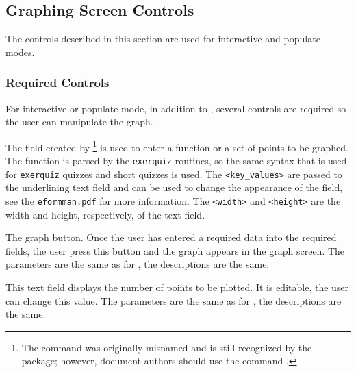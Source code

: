 \documentclass{article}
\begin{document}
\subsection{Graphing Screen Controls}

The controls described in this section are used for interactive and
populate modes.

\subsubsection{Required Controls}

For interactive or populate mode, in addition to ,
several controls are required so the user can manipulate the graph.

\begin{dCmd}{.75\linewidth}
\end{dCmd}
\CmdDescription The field created by
\footnote{The command was originally misnamed
 and is still recognized by the {\AcroFLeX}
package; however, document authors should use the command
.} is used to enter a function or a set of points
to be graphed. The function is parsed by the \texttt{exerquiz}
routines, so the same syntax that is used for \texttt{exerquiz}
quizzes and short quizzes is used. The \texttt{<key\_values>} are
passed to the underlining text field and can be used to change the
appearance of the field, see the \texttt{eformman.pdf} for more
information. The \texttt{<width>} and \texttt{<height>} are the
width and height, respectively, of the text field.

\begin{dCmd}{.75\linewidth}
\end{dCmd}
\CmdDescription The graph button. Once the user has entered a
required data into the required fields, the user press this button
and the graph appears in the graph screen. The parameters are the
same as for , the descriptions are the same.

\begin{dCmd}{.75\linewidth}
\end{dCmd}
\CmdDescription This text field displays the number of points to be
plotted. It is editable, the user can change this value. The
parameters are the same as for , the descriptions
are the same.
\end{document}
